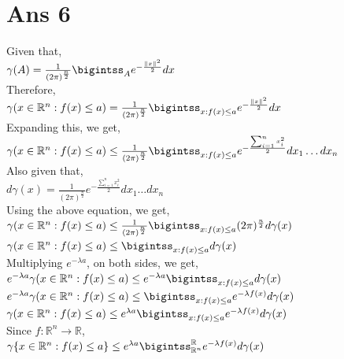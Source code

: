 \documentclass[10pt]{article}
\begin{document}
\section*{Ans 6}
\begin{flushleft}
Given that,\\
$\gamma(A) = \frac{1}{(2\pi)^\frac{n}{2}} \bigintss_{A} e^{-\frac{\parallel x \parallel^{2}}{2}} dx$\\
Therefore,\\
$\gamma(x \in \mathbb{R} ^{n}: f(x) \leq a) = \frac{1}{(2\pi)^\frac{n}{2}} \bigintss_{x: f(x) \leq a} e^{-\frac{\parallel x \parallel^{2}}{2}} dx$\\
Expanding this, we get,\\
$\gamma(x \in \mathbb{R} ^{n}: f(x) \leq a) \leq \frac{1}{(2\pi)^\frac{n}{2}} \bigintss_{x: f(x) \leq a} e^{-\frac{\sum_{i=1}^{n} x_{i}^{2}}{2}} dx_{1} \ldots dx_{n}$\\
\vspace{0.5em}
Also given that,\\
$d\gamma(x) = \frac{1}{(2\pi)^\frac{n}{2}} e^{-\frac{\sum_{i=1}^{n} x_{i}^{2}}{2}} dx_{1} \ldots dx_{n}$\\
\vspace{0.5em}
Using the above equation, we get,\\
$\gamma(x \in \mathbb{R} ^{n}: f(x) \leq a) \leq \frac{1}{(2\pi)^\frac{n}{2}} \bigintss_{x: f(x) \leq a} (2\pi)^\frac{n}{2} d \gamma(x)$\\
\vspace{0.5em}
$\gamma(x \in \mathbb{R} ^{n}: f(x) \leq a) \leq \bigintss_{x: f(x) \leq a} d \gamma(x)$\\
Multiplying $e^{-\lambda a}$, on both sides, we get,\\
\vspace{0.5em}
$e^{-\lambda a} \gamma(x \in \mathbb{R} ^{n}: f(x) \leq a) \leq e^{-\lambda a} \bigintss_{x: f(x) \leq a} d \gamma(x)$\\
\vspace{0.5em}
$e^{-\lambda a} \gamma(x \in \mathbb{R} ^{n}: f(x) \leq a) \leq \bigintss_{x: f(x) \leq a} e^{-\lambda f(x)} d \gamma(x)$\\
\vspace{0.5em}
$\gamma(x \in \mathbb{R} ^{n}: f(x) \leq a) \leq e^{\lambda a} \bigintss_{x: f(x) \leq a} e^{-\lambda f(x)} d \gamma(x)$\\
\vspace{0.5em}
Since $f: \mathbb{R} ^{n} \rightarrow \mathbb{R}$,\\
\vspace{0.5em}
$\gamma\{x \in \mathbb{R} ^{n}: f(x) \leq a\} \leq e^{\lambda a} \bigintss_{\mathbb{R} ^{n}}^{\mathbb{R}} e^{-\lambda f(x)} d \gamma(x)$\\
\end{flushleft}
\end{document}

